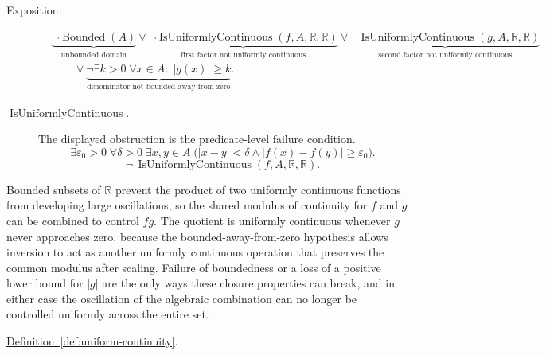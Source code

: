 \begin{remark*}
\begin{description}
  \item[Exposition.]
\[
\begin{aligned}
&\underbrace{\neg\operatorname{Bounded}(A)}_{\text{unbounded domain}}
\lor
\underbrace{\neg\operatorname{IsUniformlyContinuous}(f,A,\mathbb R,\mathbb R)}_{\text{first factor not uniformly continuous}}
\lor
\underbrace{\neg\operatorname{IsUniformlyContinuous}(g,A,\mathbb R,\mathbb R)}_{\text{second factor not uniformly continuous}}\\
&\qquad\lor
\underbrace{\neg\exists k>0\;\forall x\in A:\; |g(x)|\ge k}_{\text{denominator not bounded away from zero}}.
\end{aligned}
\]


  \item[\(\operatorname{IsUniformlyContinuous}.\)]
  The displayed obstruction is the predicate-level failure condition.
  \[
  \exists\varepsilon_0>0\;\forall\delta>0\;\exists x,y\in A\;
  \bigl(|x-y|<\delta\land |f(x)-f(y)|\ge\varepsilon_0\bigr).
  \]
  \[
  \neg\,\operatorname{IsUniformlyContinuous}(f,A,\mathbb{R},\mathbb{R}).
  \]
\end{description}
\end{remark*}

\begin{remark*}[Interpretation]
Bounded subsets of $\mathbb{R}$ prevent the product of two uniformly continuous functions from developing large oscillations, so the shared modulus of continuity for $f$ and $g$ can be combined to control $fg$. The quotient is uniformly continuous whenever $g$ never approaches zero, because the bounded-away-from-zero hypothesis allows inversion to act as another uniformly continuous operation that preserves the common modulus after scaling. Failure of boundedness or a loss of a positive lower bound for $|g|$ are the only ways these closure properties can break, and in either case the oscillation of the algebraic combination can no longer be controlled uniformly across the entire set.
\end{remark*}

\begin{dependencies}
\hyperref[def:uniform-continuity]{Definition~\ref*{def:uniform-continuity}}.
\end{dependencies}


